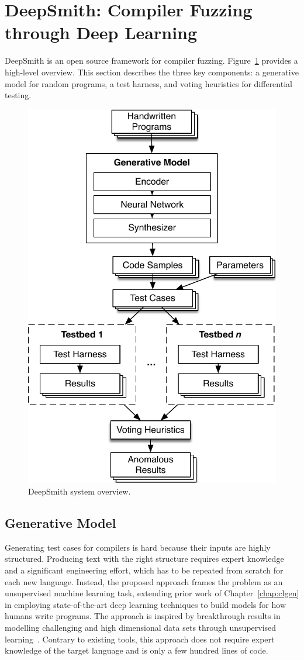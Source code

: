 \section{DeepSmith: Compiler Fuzzing through Deep Learning}
\label{sec:deepsmith}

DeepSmith is an open source framework for compiler fuzzing. Figure~\ref{fig:deepsmith} provides a high-level overview. This section describes the three key components: a generative model for random programs, a test harness, and voting heuristics for differential testing.

\begin{figure}
  \centering
  \includegraphics[width=.7\columnwidth]{img/deepsmith}
  \caption[DeepSmith system overview]{%
    DeepSmith system overview.
  }%
  \label{fig:deepsmith}
\end{figure}

\subsection{Generative Model}

Generating test cases for compilers is hard because their inputs are highly structured. Producing text with the right structure requires expert knowledge and a significant engineering effort, which has to be repeated from scratch for each new language. Instead, the proposed approach frames the problem as an unsupervised machine learning task, extending prior work of Chapter~\ref{chap:clgen} in employing state-of-the-art deep learning techniques to build models for how humans write programs. The approach is inspired by breakthrough results in modelling challenging and high dimensional data sets through unsupervised learning~\cite{Raghu2016,Radford2016b,Bowman2015}. Contrary to existing tools, this approach does not require expert knowledge of the target language and is only a few hundred lines of code.

